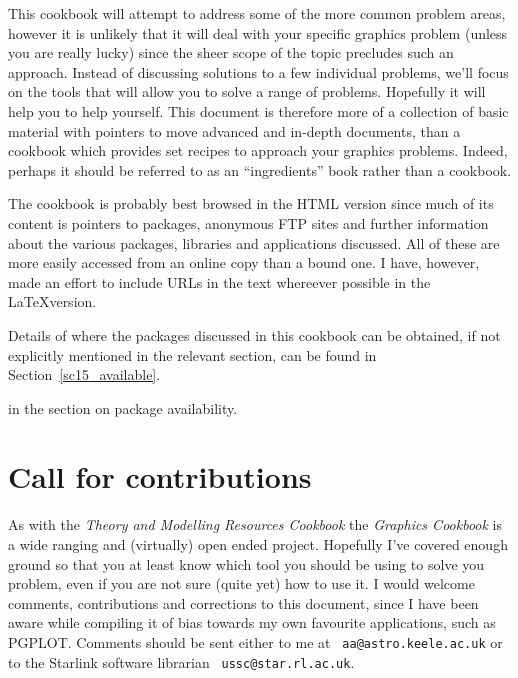 \documentclass[twoside,11pt]{article}
\newcommand{\htmladdnormallink}[2]{#1}
\newcommand{\htmlref}[2]{#1}
\newcommand{\latex}[1]{#1}
\newcommand{\xref}[3]{#1}
\newcommand{\xlabel}[1]{}
\begin{document}
This cookbook will attempt to address some of the more common problem
areas, however it is unlikely that it will deal with your specific
graphics problem (unless you are really lucky) since the sheer scope
of the topic precludes such an approach. Instead of discussing
solutions to a few individual problems, we'll focus on the tools that
will allow you to solve a range of problems. Hopefully it will help
you to help yourself. This document is therefore more of a collection
of basic material with pointers to move advanced and in-depth
documents, than a cookbook which provides set recipes to approach your
graphics problems. Indeed, perhaps it should be referred to as an
``ingredients'' book rather than a cookbook. 

The cookbook is probably best browsed in the HTML version since much
of its content is pointers to packages, anonymous FTP sites and
further information about the various packages, libraries and
applications discussed. All of these are more easily accessed from an
online copy than a bound one. I have, however, made an effort to
include URLs in the text whereever possible in the \LaTeX version.

Details of where the packages discussed in this cookbook can be
obtained, if not explicitly mentioned in the relevant section, can be
found \latex{ in Section~\ref{sc15_available}.}
\begin{htmlonly}
in the section on \htmlref{package availability}{sc15_available}.
\end{htmlonly}

\section{\xlabel{sc15_call}Call for contributions\label{sc15_call}}

As with the \xref{{\em Theory and Modelling Resources
Cookbook}}{sc13}{} the {\em Graphics Cookbook} is a wide ranging and
(virtually) open ended project. Hopefully I've covered enough ground
so that you at least know which tool you should be using to solve you
problem, even if you are not sure (quite yet) how to use it. I would
welcome comments, contributions and corrections to this document,
since I have been aware while compiling it of bias towards my own
favourite applications, such as PGPLOT. Comments should be sent either
to me at \htmladdnormallink{{\tt
aa@astro.keele.ac.uk}}{mailto:aa@astro.keele.ac.uk} or to the Starlink
software librarian \htmladdnormallink{{\tt
ussc@star.rl.ac.uk}}{mailto:ussc@star.rl.ac.uk}. 
\end{document}
